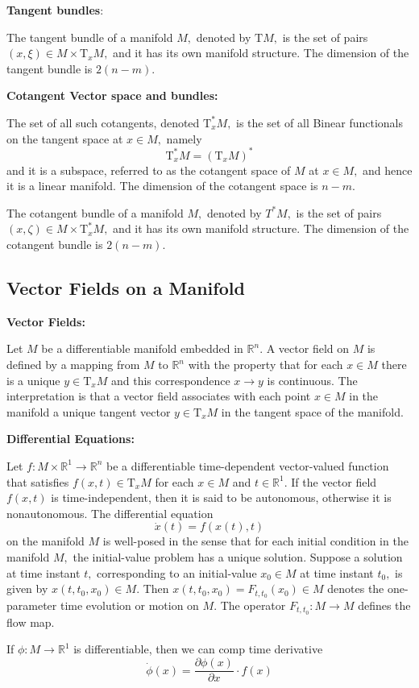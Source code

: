 \documentclass[13pt]{article}
\theoremstyle{definition}
\newcommand{\bm}{\textbf}
\begin{document}
\bm{Tangent bundles}:

The tangent bundle of a manifold $M,$ denoted by $\mathrm{T} M,$ is the set of pairs $(x, \xi) \in M \times \mathrm{T}_{x} M,$ and it has its own manifold structure. The dimension of the tangent bundle is $2(n-m)$.

\bm{Cotangent Vector space and bundles:}

The set of all such cotangents, denoted $\mathrm{T}_{x}^{*} M,$ is the set of all Binear functionals on the tangent space at $x \in M,$ namely
\begin{equation}
\mathrm{T}_{x}^{*} M=\left(\mathrm{T}_{x} M\right)^{*}
\end{equation}
and it is a subspace, referred to as the cotangent space of $M$ at $x \in M,$ and hence it is a linear manifold. The dimension of the cotangent space is $n-m$.

The cotangent bundle of a manifold $M,$ denoted by $T^{*} M,$ is the set of pairs $(x, \zeta) \in M \times \mathrm{T}_{x}^{*} M,$ and it has its own manifold structure. The dimension of the cotangent bundle is $2(n-m)$.
\subsection{Vector Fields on a Manifold}
\bm{Vector Fields:}

Let $M$ be a differentiable manifold embedded in $\mathbb{R}^{n} .$ A vector field on $M$ is defined by a mapping from $M$ to $\mathbb{R}^{n}$ with the property that for each $x \in M$ there is a unique $y \in \mathrm{T}_{x} M$ and this correspondence $x \rightarrow y$ is continuous. The interpretation is that a vector field associates with each point $x \in M$ in the manifold a unique tangent vector $y \in \mathrm{T}_{x} M$ in the tangent space of the manifold.

\bm{Differential Equations:}

Let $f: M \times \mathbb{R}^{1} \rightarrow \mathbb{R}^{n}$ be a differentiable time-dependent vector-valued function that satisfies $f(x, t) \in \mathrm{T}_{x} M$ for each $x \in M$ and $t \in \mathbb{R}^{1} .$ If the vector field $f(x, t)$ is time-independent, then it is said to be autonomous, otherwise it is nonautonomous. The differential equation
\begin{equation}
\dot{x}(t)=f(x(t), t)
\end{equation}
on the manifold $M$ is well-posed in the sense that for each initial condition in the manifold $M,$ the initial-value problem has a unique solution. Suppose 
a solution at time instant $t,$ corresponding to an initial-value $x_{0} \in M$ at time instant $t_{0},$ is given by $x\left(t, t_{0}, x_{0}\right) \in M .$ Then $x\left(t, t_{0}, x_{0}\right)=F_{t, t_{0}}\left(x_{0}\right) \in M$
denotes the one-parameter time evolution or motion on $M .$ The operator $F_{t, t_{0}}: M \rightarrow M$ defines the flow map.  

If $\phi: M \rightarrow \mathbb{R}^{1}$ is differentiable, then we can comp time derivative
\begin{equation}
\dot{\phi}(x)=\frac{\partial \phi(x)}{\partial x} \cdot f(x)
\end{equation}

\begin{shaded}

\end{shaded}
\end{document}

